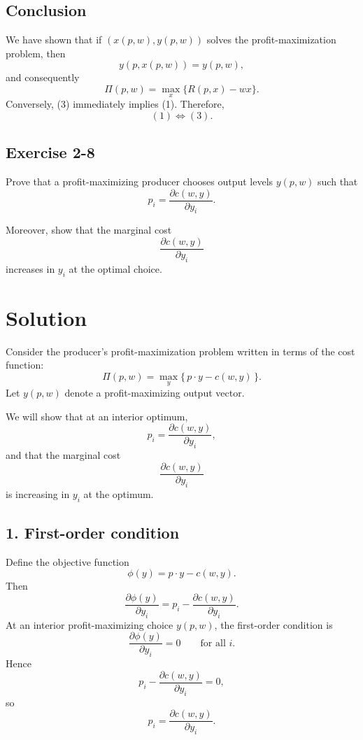 \subsection*{Conclusion}

We have shown that if \((x(p,w),y(p,w))\) solves the profit-maximization problem, then
\[
y(p,x(p,w))=y(p,w),
\]
and consequently
\[
\Pi(p,w)=\max_x\{R(p,x)-wx\}.
\]
Conversely, (3) immediately implies (1). Therefore,
\[
\boxed{(1)\iff (3).}
\]


\vspace{30pt}
\begin{tcolorbox}[breakable]

\subsection*{Exercise 2-8}

Prove that a profit-maximizing producer chooses output levels $y(p,w)$ such that
\[
p_i = \frac{\partial c(w,y)}{\partial y_i}.
\]

Moreover, show that the marginal cost
\[
\frac{\partial c(w,y)}{\partial y_i}
\]
increases in $y_i$ at the optimal choice.

\end{tcolorbox}



\section*{Solution}

Consider the producer's profit-maximization problem written in terms of the cost function:
\[
\Pi(p,w)=\max_{y}\{\,p\cdot y-c(w,y)\,\}.
\]
Let \(y(p,w)\) denote a profit-maximizing output vector.

We will show that at an interior optimum,
\[
p_i=\frac{\partial c(w,y)}{\partial y_i},
\]
and that the marginal cost
\[
\frac{\partial c(w,y)}{\partial y_i}
\]
is increasing in \(y_i\) at the optimum.

\subsection*{1. First-order condition}

Define the objective function
\[
\phi(y)=p\cdot y-c(w,y).
\]
Then
\[
\frac{\partial \phi(y)}{\partial y_i}
=
p_i-\frac{\partial c(w,y)}{\partial y_i}.
\]
At an interior profit-maximizing choice \(y(p,w)\), the first-order condition is
\[
\frac{\partial \phi(y)}{\partial y_i}=0
\qquad \text{for all } i.
\]
Hence
\[
p_i-\frac{\partial c(w,y)}{\partial y_i}=0,
\]
so
\[
\boxed{
p_i=\frac{\partial c(w,y)}{\partial y_i}.
}
\]

